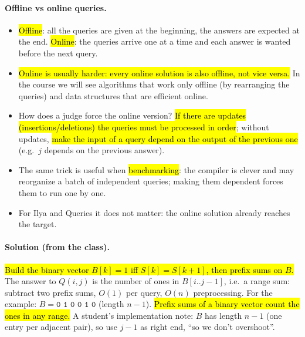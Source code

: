 \documentclass[11pt,a4paper]{article}
\theoremstyle{definition}\newtheorem*{definition}{Definition}
\newcommand{\hly}[1]{{\sethlcolor{hlY}\hl{#1}}}
\newcommand{\hlg}[1]{{\sethlcolor{hlG}\hl{#1}}}
\newcommand{\hlb}[1]{{\sethlcolor{hlB}\hl{#1}}}
\begin{document}
\paragraph{Offline vs online queries.}
\begin{itemize}[nosep]
\item \hlb{Offline}: all the queries are given at the beginning, the answers are expected at the end. \hlb{Online}: the queries arrive one at a time and each answer
      is wanted before the next query.
\item \hly{Online is usually harder: every online solution is also offline, not vice versa.} In the course we will see algorithms that work only offline (by rearranging the queries)
      and data structures that are efficient online.
\item How does a judge force the online version? \hly{If there are updates (insertions/deletions) the queries must be processed in order}; without updates,
      \hly{make the input of a query depend on the output of the previous one} (e.g.\ $j$ depends on the previous answer).
\item The same trick is useful when \hly{benchmarking}: the compiler is clever and may reorganize a batch of independent queries; making them dependent forces them to run one by one.
\item For Ilya and Queries it does not matter: the online solution already reaches the target.
\end{itemize}

\paragraph{Solution (from the class).} \hlg{Build the binary vector \mbox{$B[k]=1$} iff \mbox{$S[k]=S[k+1]$}, then prefix sums on \mbox{$B$}.}
The answer to $Q(i,j)$ is the number of ones in $B[i..j-1]$, i.e.\ a range sum: subtract two prefix sums, $O(1)$ per query, $O(n)$ preprocessing.
For the example: $B=\texttt{0 1 0 0 1 0}$ (length $n-1$). \hly{Prefix sums of a binary vector count the ones in any range.}
A student's implementation note: $B$ has length $n-1$ (one entry per adjacent pair), so use $j-1$ as right end, ``so we don't overshoot''.
\end{document}
